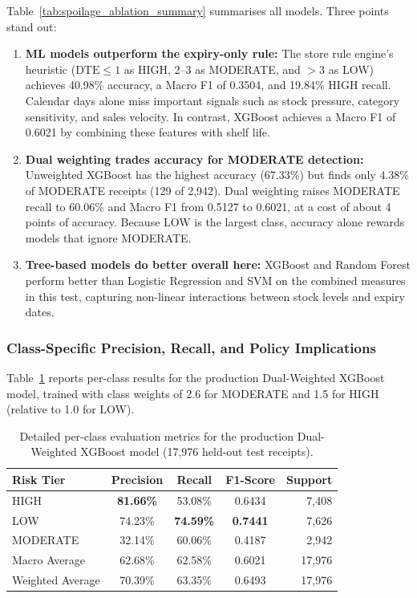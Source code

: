 \documentclass[12pt,a4paper]{article}
\renewcommand{\_}{\oldunderscore\allowbreak}
\begin{document}
Table~\ref{tab:spoilage_ablation_summary} summarises all models. Three points stand out:
\begin{enumerate}[leftmargin=18pt, itemsep=2pt]
    \item \textbf{ML models outperform the expiry-only rule:} The store rule engine's heuristic ($\text{DTE} \le 1$ as HIGH, 2--3 as MODERATE, and $> 3$ as LOW) achieves 40.98\% accuracy, a Macro F1 of 0.3504, and 19.84\% HIGH recall. Calendar days alone miss important signals such as stock pressure, category sensitivity, and sales velocity. In contrast, XGBoost achieves a Macro F1 of 0.6021 by combining these features with shelf life.
    \item \textbf{Dual weighting trades accuracy for MODERATE detection:} Unweighted XGBoost has the highest accuracy (67.33\%) but finds only 4.38\% of MODERATE receipts (129 of 2,942). Dual weighting raises MODERATE recall to 60.06\% and Macro F1 from 0.5127 to 0.6021, at a cost of about 4 points of accuracy. Because LOW is the largest class, accuracy alone rewards models that ignore MODERATE.
    \item \textbf{Tree-based models do better overall here:} XGBoost and Random Forest perform better than Logistic Regression and SVM on the combined measures in this test, capturing non-linear interactions between stock levels and expiry dates.
\end{enumerate}

\subsubsection{Class-Specific Precision, Recall, and Policy Implications}
\label{sec:per_class_metrics}

Table~\ref{tab:xgboost_per_class} reports per-class results for the production Dual-Weighted XGBoost model, trained with class weights of 2.6 for MODERATE and 1.5 for HIGH (relative to 1.0 for LOW).

\begin{table}[H]
\centering
\caption{Detailed per-class evaluation metrics for the production Dual-Weighted XGBoost model (17,976 held-out test receipts).}
\label{tab:xgboost_per_class}
\renewcommand{\arraystretch}{1.15}
\setlength{\tabcolsep}{6pt}
{\footnotesize
\begin{tabular}{@{} l c c c r @{}}
\toprule
\rowcolor{NavyPrimary}
\color{white}\textbf{Risk Tier} & \color{white}\textbf{Precision} & \color{white}\textbf{Recall} & \color{white}\textbf{F1-Score} & \color{white}\textbf{Support} \\
\midrule
HIGH & \textbf{81.66\%} & 53.08\% & 0.6434 & 7,408 \\
\rowcolor{LightBg}
LOW & 74.23\% & \textbf{74.59\%} & \textbf{0.7441} & 7,626 \\
MODERATE & 32.14\% & 60.06\% & 0.4187 & 2,942 \\
\midrule
Macro Average & 62.68\% & 62.58\% & 0.6021 & 17,976 \\
\rowcolor{LightBg}
Weighted Average & 70.39\% & 63.35\% & 0.6493 & 17,976 \\
\bottomrule
\end{tabular}}
\end{table}
\end{document}
